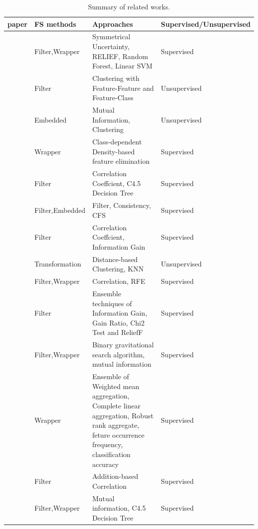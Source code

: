 \documentclass{ieeeaccess}
\theoremstyle{definition}
\begin{document}
\begin{table}[!htbp]
    \centering
    \caption{Summary of related works.}
        \begin{tabular}{p{3em}p{8em}p{20em}p{11em}}
        \toprule
        paper & FS methods & Approaches & Supervised/Unsupervised \\
        \midrule
        \cite{Saeys2008} & Filter,\newline{}Wrapper & Symmetrical Uncertainty, RELIEF, Random Forest, Linear SVM & Supervised \\
        \cite{Hsu2010} & Filter & Clustering with Feature-Feature and Feature-Class & Unsupervised \\
        \cite{Liu2011} & Embedded & Mutual Information, Clustering & Unsupervised \\
        \cite{Javed2012} & Wrapper & Class-dependent Density-based feature elimination & Supervised \\
        \cite{Eid2013} & Filter & Correlation Coeffcient, C4.5 Decision Tree & Supervised \\
        \cite{Singh2015} & Filter,\newline{}Embedded & Filter, Consistency, CFS  & Supervised \\
        \cite{Wahba2015} & Filter & Correlation Coeffcient, Information Gain & Supervised \\
        \cite{CANN2015} & Transformation & Distance-based Clustering, KNN & Unsupervised \\
        \cite{Iglesias2015} & Filter,\newline{}Wrapper & Correlation, RFE & Supervised \\
        \cite{Osanaiye2016} & Filter & Ensemble techniques of Information Gain, Gain Ratio, Chi2 Test and ReliefF & Supervised \\
        \cite{Bostani2017} & Filter,\newline{}Wrapper & Binary gravitational search algorithm, mutual information & Supervised \\
        \cite{Brahim2018} & Wrapper & Ensemble of Weighted mean aggregation, Complete linear aggregation, Robust rank aggregate, feture occurrence frequency, classification accuracy & Supervised \\
        \cite{CorrCorr2019} & Filter & Addition-based Correlation & Supervised \\
        \cite{Selvakumar2019} & Filter,\newline{}Wrapper & Mutual information, C4.5 Decision Tree & Supervised \\
        \bottomrule
        \end{tabular}%
    \label{tab:related-works}%
\end{table}%
\end{document}
